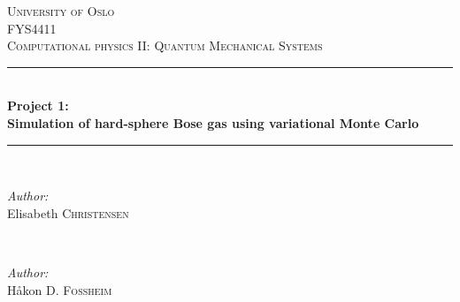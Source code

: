 \documentclass[
    a4paper, aps, twocolumn, floatfix, superscriptaddress,
    nofootinbib]{revtex4-1}
\title{}
\begin{document}


{\setlength\doublerulesep{5pt}}   %

\begin{titlepage}

\newcommand{\HRule}{\rule{\linewidth}{0.5mm}} %

\center %
 

\textsc{\LARGE University of Oslo}\\[1.5cm] %
\textsc{\Large FYS4411}\\[0.5cm] %
\textsc{\large Computational physics II: Quantum Mechanical Systems}\\[0.5cm] %


\HRule \\[0.4cm]
{ \huge \bfseries Project 1: \\ Simulation of hard-sphere Bose gas using variational Monte Carlo}\\[0.4cm] %
\HRule \\[1.5cm]
 

\begin{minipage}{0.4\textwidth}
\begin{flushleft} \large
\emph{Author:}\\
Elisabeth \textsc{Christensen} %
\end{flushleft}
\end{minipage}
~
\begin{minipage}{0.4\textwidth}
\begin{flushright} \large
\emph{Author:} \\
Håkon \textsc{D. Fossheim} %
\end{flushright}


\end{minipage}
\end{titlepage}
\end{document}
